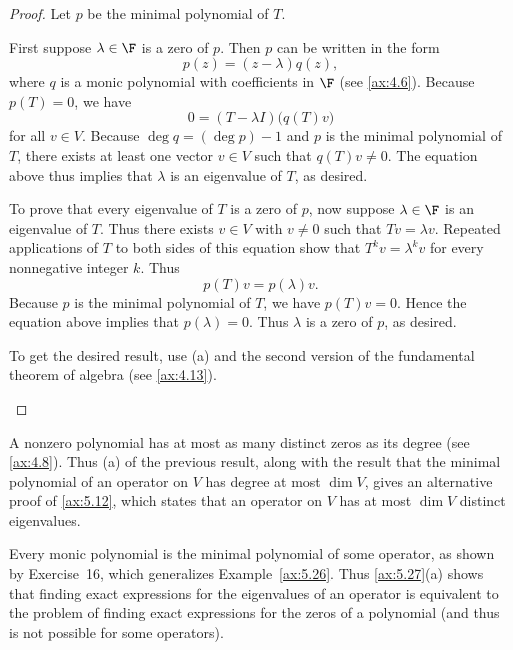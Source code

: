 \begin{proof}
Let $p$ be the minimal polynomial of $T$.
\begin{parts}
\item First suppose $\lambda\in\F$ is a zero of $p$. Then $p$ can be written
  in the form
  \[ p(z)=(z-\lambda)q(z), \]
  where $q$ is a monic polynomial with coefficients in $\F$ (see
  \ref{ax:4.6}). Because $p(T)=0$, we have
  \[ 0=(T-\lambda I)\bigl(q(T)v\bigr) \]
  for all $v\in V$. Because $\deg q=(\deg p)-1$ and $p$ is the minimal
  polynomial of $T$, there exists at least one vector $v\in V$ such that
  $q(T)v\ne0$. The equation above thus implies that $\lambda$ is an eigenvalue
  of $T$, as desired.

  To prove that every eigenvalue of $T$ is a zero of $p$, now suppose
  $\lambda\in\F$ is an eigenvalue of $T$. Thus there exists $v\in V$ with
  $v\ne0$ such that $Tv=\lambda v$. Repeated applications of $T$ to both sides
  of this equation show that $T^kv=\lambda^kv$ for every nonnegative integer
  $k$. Thus
  \[ p(T)v=p(\lambda)v. \]
  Because $p$ is the minimal polynomial of $T$, we have $p(T)v=0$. Hence the
  equation above implies that $p(\lambda)=0$. Thus $\lambda$ is a zero of
  $p$, as desired.
\item To get the desired result, use (a) and the second version of the
  fundamental theorem of algebra (see \ref{ax:4.13}). \qedhere
\end{parts}
\end{proof}

A nonzero polynomial has at most as many distinct zeros as its degree (see
\ref{ax:4.8}). Thus (a) of the previous result, along with the result that the
minimal polynomial of an operator on $V$ has degree at most $\dim V$, gives an
alternative proof of \ref{ax:5.12}, which states that an operator on $V$ has
at most $\dim V$ distinct eigenvalues.

Every monic polynomial is the minimal polynomial of some operator, as shown by
Exercise~16, which generalizes Example~\ref{ax:5.26}. Thus \ref{ax:5.27}(a)
shows that finding exact expressions for the eigenvalues of an operator is
equivalent to the problem of finding exact expressions for the zeros of a
polynomial (and thus is not possible for some operators).

